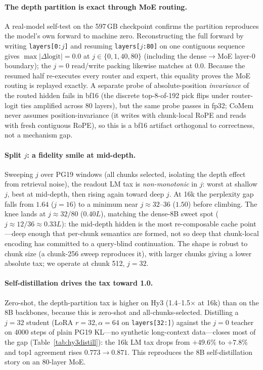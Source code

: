 \paragraph{The depth partition is exact through MoE routing.} A real-model
self-test on the 597\,GB checkpoint confirms the partition reproduces the
model's own forward to machine zero. Reconstructing the full forward by writing
\texttt{layers[0:$j$]} and resuming \texttt{layers[$j$:80]} on one contiguous
sequence gives $\max|\Delta\text{logit}|{=}0.0$ at $j\in\{0,1,40,80\}$
(including the dense$\to$MoE layer-0 boundary); the $j{=}0$ read/write packing
likewise matches at $0.0$. Because the resumed half re-executes every router and
expert, this equality proves the MoE routing is replayed exactly. A separate
probe of absolute-position \emph{invariance} of the routed hidden fails in bf16
(the discrete top-8-of-192 pick flips under router-logit ties amplified across
80 layers), but the same probe passes in fp32; CoMem never assumes
position-invariance (it writes with chunk-local RoPE and reads with fresh
contiguous RoPE), so this is a bf16 artifact orthogonal to correctness, not a
mechanism gap.

\paragraph{Split $j$: a fidelity smile at mid-depth.} Sweeping $j$ over PG19
windows (all chunks selected, isolating the depth effect from retrieval noise),
the readout LM tax is \emph{non-monotonic} in $j$: worst at shallow $j$, best at
mid-depth, then rising again toward deep $j$. At 16k the perplexity gap falls
from $1.64$ ($j{=}16$) to a minimum near $j{\approx}32$--$36$ ($1.50$) before
climbing. The knee lands at $j{\approx}32/80$ ($0.40L$), matching the dense-8B
sweet spot ($j{\approx}12/36\approx0.33L$): the mid-depth hidden is the most
re-composable cache point---deep enough that per-chunk semantics are formed, not
so deep that chunk-local encoding has committed to a query-blind continuation.
The shape is robust to chunk size (a chunk-256 sweep reproduces it), with larger
chunks giving a lower absolute tax; we operate at chunk 512, $j{=}32$.

\paragraph{Self-distillation drives the tax toward 1.0.} Zero-shot, the
depth-partition tax is higher on Hy3 (1.4--1.5$\times$ at 16k) than on the 8B
backbones, because this is zero-shot and all-chunks-selected. Distilling a
$j{=}32$ student (LoRA $r{=}32,\alpha{=}64$ on \texttt{layers[32:]}) against the
$j{=}0$ teacher on 4000 steps of plain PG19 KL---no synthetic long-context
data---closes most of the gap (Table~\ref{tab:hy3distill}): the 16k LM tax drops
from $+49.6\%$ to $+7.8\%$ and top1 agreement rises $0.773\to0.871$. This
reproduces the 8B self-distillation story on an $80$-layer MoE.

